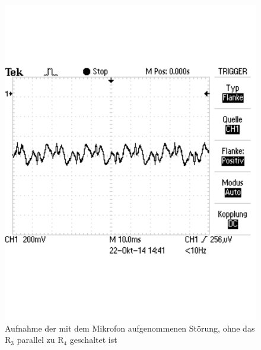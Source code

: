 \documentclass[12pt,a4paper]{article}
\begin{document}
\begin{figure}[H] 
  \centering
    \includegraphics[scale = 0.4]{2_3_r3np_st.pdf}
  	\caption[Aufnahme der mit dem Mikrofon aufgenommenen Störung, ohne das R$_3$ parallel zu R$_4$ geschaltet ist]{Aufnahme der mit dem Mikrofon aufgenommenen Störung, ohne das R$_3$ parallel zu R$_4$ geschaltet ist}
  \label{fig:2_3_r3np_st}
\end{figure}
\end{document}
